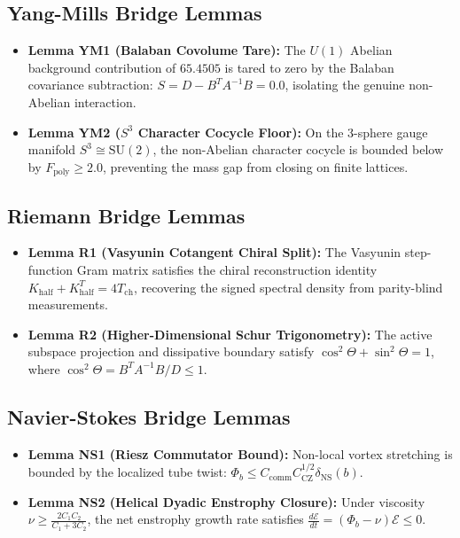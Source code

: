 \documentclass[11pt,a4paper]{article}
\theoremstyle{definition}
\begin{document}
\subsection{Yang-Mills Bridge Lemmas}
\begin{itemize}
    \item \textbf{Lemma YM1 (Balaban Covolume Tare):} The $U(1)$ Abelian background contribution of $65.4505$ is tared to zero by the Balaban covariance subtraction: $S = D - B^T A^{-1} B = 0.0$, isolating the genuine non-Abelian interaction.
    \item \textbf{Lemma YM2 ($S^3$ Character Cocycle Floor):} On the 3-sphere gauge manifold $S^3 \cong \mathrm{SU}(2)$, the non-Abelian character cocycle is bounded below by $F_{\mathrm{poly}} \ge 2.0$, preventing the mass gap from closing on finite lattices.
\end{itemize}

\subsection{Riemann Bridge Lemmas}
\begin{itemize}
    \item \textbf{Lemma R1 (Vasyunin Cotangent Chiral Split):} The Vasyunin step-function Gram matrix satisfies the chiral reconstruction identity $K_{\mathrm{half}} + K_{\mathrm{half}}^T = 4 T_{\mathrm{ch}}$, recovering the signed spectral density from parity-blind measurements.
    \item \textbf{Lemma R2 (Higher-Dimensional Schur Trigonometry):} The active subspace projection and dissipative boundary satisfy $\cos^2\Theta + \sin^2\Theta = 1$, where $\cos^2\Theta = B^T A^{-1} B / D \le 1$.
\end{itemize}

\subsection{Navier-Stokes Bridge Lemmas}
\begin{itemize}
    \item \textbf{Lemma NS1 (Riesz Commutator Bound):} Non-local vortex stretching is bounded by the localized tube twist: $\Phi_b \le C_{\mathrm{comm}} C_{\mathrm{CZ}}^{1/2} \delta_{\mathrm{NS}}(b)$.
    \item \textbf{Lemma NS2 (Helical Dyadic Enstrophy Closure):} Under viscosity $\nu \ge \frac{2C_1 C_2}{C_1 + 3C_2}$, the net enstrophy growth rate satisfies $\frac{d\mathcal{E}}{dt} = (\Phi_b - \nu)\mathcal{E} \le 0$.
\end{itemize}
\end{document}
